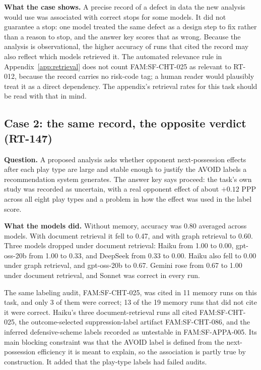 \documentclass[11pt]{article}
\begin{document}
\textbf{What the case shows.} A precise record of a defect in data the new analysis would use was associated with correct stops for some models. It did not guarantee a stop: one model treated the same defect as a design step to fix rather than a reason to stop, and the answer key scores that as wrong. Because the analysis is observational, the higher accuracy of runs that cited the record may also reflect which models retrieved it. The automated relevance rule in Appendix~\ref{app:retrieval} does not count FAM:SF-CHT-025 as relevant to RT-012, because the record carries no risk-code tag; a human reader would plausibly treat it as a direct dependency. The appendix's retrieval rates for this task should be read with that in mind.

\subsection{Case 2: the same record, the opposite verdict (RT-147)}
\label{sec:rt147}

\textbf{Question.} A proposed analysis asks whether opponent next-possession effects after each play type are large and stable enough to justify the AVOID labels a recommendation system generates. The answer key says proceed: the task's own study was recorded as uncertain, with a real opponent effect of about $+0.12$ PPP across all eight play types and a problem in how the effect was used in the label score.

\textbf{What the models did.} Without memory, accuracy was 0.80 averaged across models. With document retrieval it fell to 0.47, and with graph retrieval to 0.60. Three models dropped under document retrieval: Haiku from 1.00 to 0.00, gpt-oss-20b from 1.00 to 0.33, and DeepSeek from 0.33 to 0.00. Haiku also fell to 0.00 under graph retrieval, and gpt-oss-20b to 0.67. Gemini rose from 0.67 to 1.00 under document retrieval, and Sonnet was correct in every run.

The same labeling audit, FAM:SF-CHT-025, was cited in 11 memory runs on this task, and only 3 of them were correct; 13 of the 19 memory runs that did not cite it were correct. Haiku's three document-retrieval runs all cited FAM:SF-CHT-025, the outcome-selected suppression-label artifact FAM:SF-CHT-086, and the inferred defensive-scheme labels recorded as untestable in FAM:SF-APPA-005. Its main blocking constraint was that the AVOID label is defined from the next-possession efficiency it is meant to explain, so the association is partly true by construction. It added that the play-type labels had failed audits.
\end{document}
